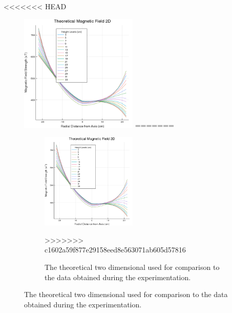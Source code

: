 \documentclass[a4paper]{article}
\begin{document}
<<<<<<< HEAD
\begin{figure}
\centering
\includegraphics[width=0.5\textwidth]{2DPlotTheoretical.png}
\label{Theoretical 2-D plot}
=======
\begin{figure}[H]
  \begin{center}
    \includegraphics[width=0.5\textwidth]{2DPlotTheoretical.png}
  \end{center}
  \caption{The theoretical two dimensional used for comparison to the data
    obtained during the experimentation.}
  \label{Theoretical 2-D plot}
>>>>>>> c1602a59f877e29158eed8e563071ab605d57816
\end{figure}


\end{figure}
\end{document}
